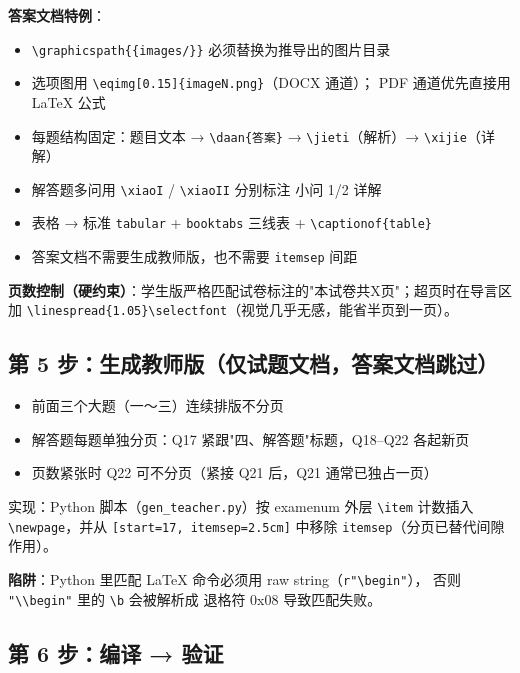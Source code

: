 \documentclass[11pt,a4paper]{ctexart}
\begin{document}
\textbf{答案文档特例}：

\begin{itemize}
  \item \texttt{\textbackslash graphicspath\{\{images/\}\}} 必须替换为推导出的图片目录
  \item 选项图用 \texttt{\textbackslash eqimg[0.15]\{imageN.png\}}（DOCX 通道）；
        PDF 通道优先直接用 LaTeX 公式
  \item 每题结构固定：题目文本 → \texttt{\textbackslash daan\{答案\}} →
        \texttt{\textbackslash jieti}（解析）→ \texttt{\textbackslash xijie}（详解）
  \item 解答题多问用 \texttt{\textbackslash xiaoI} / \texttt{\textbackslash xiaoII} 分别标注
        小问 1/2 详解
  \item 表格 → 标准 \texttt{tabular} + \texttt{booktabs} 三线表 + \texttt{\textbackslash captionof\{table\}}
  \item 答案文档不需要生成教师版，也不需要 \texttt{itemsep} 间距
\end{itemize}

\textbf{页数控制（硬约束）}：学生版严格匹配试卷标注的"本试卷共X页"；超页时在导言区加
\texttt{\textbackslash linespread\{1.05\}\textbackslash selectfont}（视觉几乎无感，能省半页到一页）。

\subsection{第 5 步：生成教师版（仅试题文档，答案文档跳过）}

\begin{itemize}
  \item 前面三个大题（一～三）连续排版不分页
  \item 解答题每题单独分页：Q17 紧跟"四、解答题"标题，Q18--Q22 各起新页
  \item 页数紧张时 Q22 可不分页（紧接 Q21 后，Q21 通常已独占一页）
\end{itemize}

实现：Python 脚本（\texttt{gen\_teacher.py}）按 examenum 外层 \texttt{\textbackslash item}
计数插入 \texttt{\textbackslash newpage}，并从 \texttt{[start=17, itemsep=2.5cm]} 中移除
\texttt{itemsep}（分页已替代间隙作用）。

\textbf{陷阱}：Python 里匹配 LaTeX 命令必须用 raw string（\texttt{r"\textbackslash begin"}），
否则 \texttt{"\textbackslash\textbackslash begin"} 里的 \texttt{\textbackslash b} 会被解析成
退格符 0x08 导致匹配失败。

\subsection{第 6 步：编译 → 验证}
\end{document}
